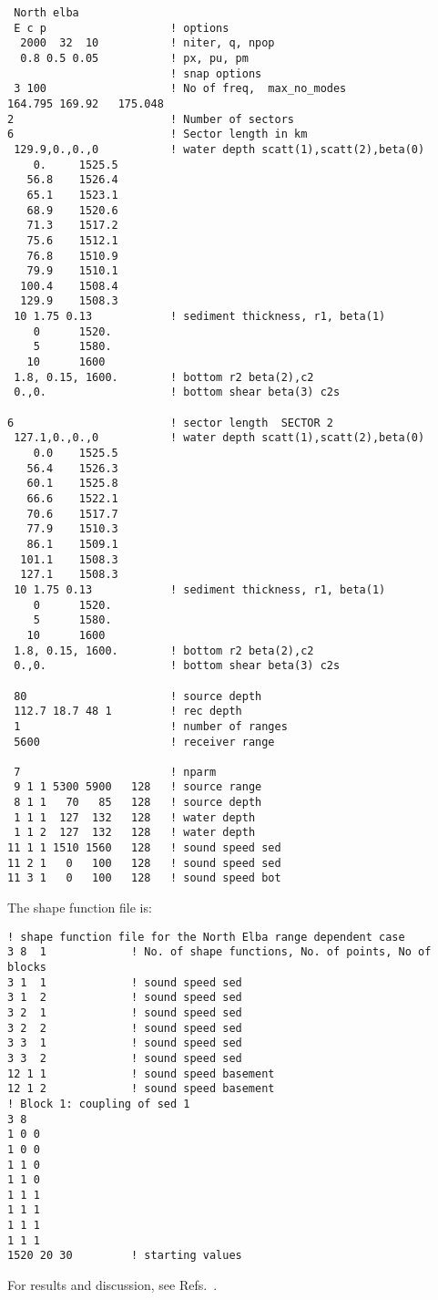 \documentclass{saclantc}
\begin{document}
\footnotesize
\begin{verbatim}
 North elba
 E c p                   ! options 
  2000  32  10           ! niter, q, npop
  0.8 0.5 0.05           ! px, pu, pm
                         ! snap options
 3 100                   ! No of freq,  max_no_modes
164.795 169.92   175.048                     
2                        ! Number of sectors
6                        ! Sector length in km
 129.9,0.,0.,0           ! water depth scatt(1),scatt(2),beta(0)
    0.     1525.5
   56.8    1526.4
   65.1    1523.1
   68.9    1520.6
   71.3    1517.2
   75.6    1512.1
   76.8    1510.9
   79.9    1510.1
  100.4    1508.4
  129.9    1508.3
 10 1.75 0.13            ! sediment thickness, r1, beta(1)
    0      1520.
    5      1580.
   10      1600
 1.8, 0.15, 1600.        ! bottom r2 beta(2),c2
 0.,0.                   ! bottom shear beta(3) c2s

6                        ! sector length  SECTOR 2
 127.1,0.,0.,0           ! water depth scatt(1),scatt(2),beta(0)
    0.0    1525.5
   56.4    1526.3
   60.1    1525.8
   66.6    1522.1
   70.6    1517.7
   77.9    1510.3
   86.1    1509.1
  101.1    1508.3
  127.1    1508.3
 10 1.75 0.13            ! sediment thickness, r1, beta(1)
    0      1520.
    5      1580.
   10      1600
 1.8, 0.15, 1600.        ! bottom r2 beta(2),c2
 0.,0.                   ! bottom shear beta(3) c2s

 80                      ! source depth
 112.7 18.7 48 1         ! rec depth
 1                       ! number of ranges
 5600                    ! receiver range

 7                       ! nparm                 
 9 1 1 5300 5900   128   ! source range         
 8 1 1   70   85   128   ! source depth           
 1 1 1  127  132   128   ! water depth
 1 1 2  127  132   128   ! water depth
11 1 1 1510 1560   128   ! sound speed sed 
11 2 1   0   100   128   ! sound speed sed
11 3 1   0   100   128   ! sound speed bot
\end{verbatim}
\normalsize

\clearpage
The shape function file is:
\small
\begin{verbatim}
! shape function file for the North Elba range dependent case
3 8  1             ! No. of shape functions, No. of points, No of blocks
3 1  1             ! sound speed sed
3 1  2             ! sound speed sed
3 2  1             ! sound speed sed
3 2  2             ! sound speed sed
3 3  1             ! sound speed sed
3 3  2             ! sound speed sed
12 1 1             ! sound speed basement
12 1 2             ! sound speed basement
! Block 1: coupling of sed 1
3 8 
1 0 0  
1 0 0  
1 1 0  
1 1 0  
1 1 1  
1 1 1  
1 1 1  
1 1 1  
1520 20 30         ! starting values
\end{verbatim}
\normalsize
For results and discussion, see  Refs.\ \cite{gingras:asa95,gerstoft:asa96}.
\end{document}

